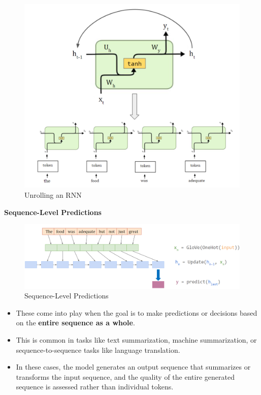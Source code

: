 \begin{figure}[h!t]
    \centering
    \includegraphics[width=0.75\linewidth]{unrolledrnn.png}
    \caption{Unrolling an RNN}
    \label{fig:enter-label}
\end{figure}

\newpage

\textbf{Sequence-Level Predictions}
\begin{figure}[h!t]
    \centering
    \includegraphics[width=1\linewidth]{sequencelevelpredictions.png}
    \caption{Sequence-Level Predictions}
    \label{fig:enter-label}
\end{figure}
\begin{itemize}
    \item  These come into play when the goal is to make predictions or decisions based on the \textbf{entire sequence as a whole}. 
    \item This is common in tasks like text summarization, machine summarization, or sequence-to-sequence tasks like language translation. 
    \item In these cases, the model generates an output sequence that summarizes or transforms the input sequence, and the quality of the entire generated sequence is assessed rather than individual tokens.
\end{itemize}


